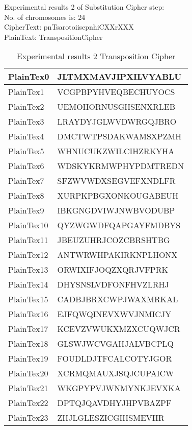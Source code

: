 \textsf{Experimental results 2 of Substitution Cipher step:}\\
    \colorbox{blue!30}{\textsf{     No. of chromosomes is: 24}}\\
    \colorbox{blue!30}{\textsf{     CipherText: pnTsarotoiisepnhiCXXrXXX}}\\
    \colorbox{blue!30}{\textsf{     PlainText: TranspositionCipher}}
\begin{table}[H]
\centering
\begin{tabular}{l l}\hline
    PlainTex0 &JLTMXMAVJIPXILVYABLU\\ \hline
PlainTex1 &VCGPBPYHVEQBECHUYOCS\\ \hline
PlainTex2 &UEMOHORNUSGHSENXRLEB\\ \hline
PlainTex3 &LRAYDYJGLWVDWRGQJBRO\\ \hline
PlainTex4 &DMCTWTPSDAKWAMSXPZMH\\ \hline
PlainTex5 &WHNUCUKZWILCIHZRKYHA\\ \hline
PlainTex6 &WDSKYKRMWPHYPDMTREDN\\ \hline
PlainTex7 &SFZWVWDXSEGVEFXNDLFR\\ \hline
PlainTex8 &XURPKPBGXONKOUGABEUH\\ \hline
PlainTex9 &IBKGNGDVIWJNWBVODUBP\\ \hline
PlainTex10 &QYZWGWDFQAPGAYFMDBYS\\ \hline
PlainTex11 &JBEUZUHRJCOZCBRSHTBG\\ \hline
PlainTex12 &ANTWRWHPAKIRKNPLHONX\\ \hline
PlainTex13 &ORWIXIFJOQZXQRJVFPRK\\ \hline
PlainTex14 &DHYSNSLVDFONFHVZLRHJ\\ \hline
PlainTex15 &CADBJBRXCWPJWAXMRKAL\\ \hline
PlainTex16 &EJFQWQINEVXWVJNMICJY\\ \hline
PlainTex17 &KCEVZVWUKXMZXCUQWJCR\\ \hline
PlainTex18 &GLSWJWCVGAHJALVBCPLQ\\ \hline
PlainTex19 &FOUDLDJTFCALCOTYJGOR\\ \hline
PlainTex20 &XCRMQMAUXJSQJCUPAICW\\ \hline
PlainTex21 &WKGPYPVJWNMYNKJEVXKA\\ \hline
PlainTex22 &DPTQJQAVDHYJHPVBAZPF\\ \hline
PlainTex23 &ZHJLGLESZICGIHSMEVHR\\ \hline
\end{tabular}
\caption{Experimental results 2 Transposition Cipher}

\end{table}


